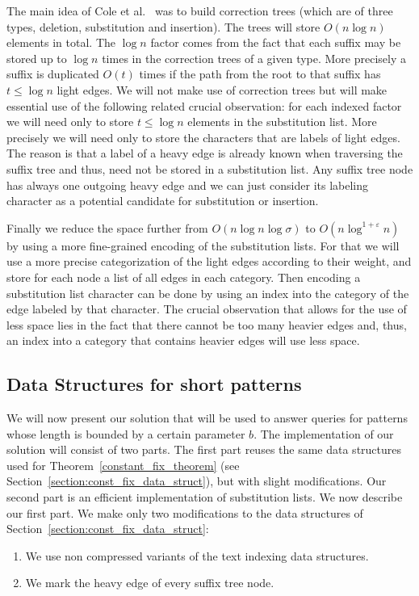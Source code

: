 \documentclass{article}
\newcommand{\?}{\mskip1.5mu}
\renewcommand{\epsilon}{\varepsilon}
\begin{document}
The main idea of Cole et al.~\cite{CGL04} was to build correction trees (which are of three types, deletion, substitution and insertion). The trees will store $O(n\log n)$ elements in total. The $\log n$ factor comes from the fact that each suffix may be stored up to $\log n$ times in the correction trees of a given type. More precisely a suffix is duplicated $O(t)$ times if the path from the root to that suffix has $t\leq \log n$ light edges. We will not make use of correction trees but will make essential use of the following related crucial observation: for each indexed factor we will need only to store $t\leq\log n$ elements in the substitution list. More precisely we will need only to store the characters that are labels of light edges. The reason is that a label of a heavy edge is already known when traversing the suffix tree and thus, need not be stored in a substitution list. Any suffix tree node has always one outgoing heavy edge and we can just consider its labeling character as a potential candidate for substitution or insertion. 

Finally we reduce the space further from $O(n\log n\log\sigma)$ to $O(n\log^{1+\epsilon}n)$ by using a more fine-grained encoding of the substitution lists. For that we will use a more precise categorization of the light edges according to their weight, and store for each node a list of all edges in each category. Then encoding a substitution list character can be done by using an index into the category of the edge labeled by that character. The crucial observation that allows for the use of less space lies in the fact that there cannot be too many heavier edges and, thus, an index into a category that contains heavier edges will use less space. 

\subsection{Data Structures for short patterns}
\label{section:DS_impl}

We will now present our solution that will be used to answer queries for patterns whose length is bounded by a certain parameter $b$. The implementation of our solution will consist of two parts. The first part reuses the same data structures used for Theorem~\ref{constant_fix_theorem} (see Section~\ref{section:const_fix_data_struct}), but with slight modifications. Our second part is an efficient implementation of substitution lists. We now describe our first part. We make only two modifications to the data structures of Section~\ref{section:const_fix_data_struct}: 
\begin{enumerate}
\item We use non compressed variants of the text indexing data structures. 
\item We mark the heavy edge of every suffix tree node. 
\end{enumerate}
\end{document}
